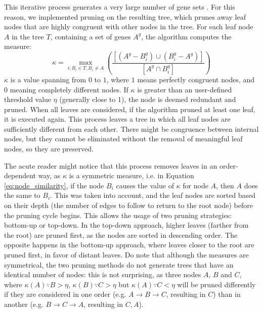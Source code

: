This iterative process generates a very large number of gene sets .
For this reason, we implemented pruning on the resulting tree, which prunes away
leaf nodes that are highly congruent with other nodes in the tree. For each leaf
node $A$ in the tree $T$, containing a set of genes $A^g$, the algorithm
computes the measure:
\begin{equation}
    \kappa = \max_{i:B_i \in T, B_i \ne A}\left(\frac{[(A^g - B_i^g) \cup (B_i^g - A^g)]}{[A^g \cap B_i^g]}\right)
    \label{eq:node_similarity}
\end{equation}
$\kappa$ is a value spanning from $0$ to $1$, where $1$ means perfectly
congruent nodes, and $0$ meaning completely different nodes. If $\kappa$ is
greater than an user-defined threshold value $\eta$ (generally close to 1),
the node is deemed redundant and pruned. When all leaves are considered, if the
algorithm pruned at least one leaf, it is executed again. This process leaves a
tree in which all leaf nodes are sufficiently different from each other. There
might be congruence between internal nodes, but they cannot be eliminated
without the removal of meaningful leaf nodes, so they are preserved.

The acute reader might notice that this process removes leaves in an
order-dependent way, as $\kappa$ is a symmetric measure, i.e. in Equation
\ref{eq:node_similarity}, if the node $B_i$ causes the value of $\kappa$ for
node $A$, then $A$ does the same to $B_i$.
This was taken into account, and the leaf nodes are sorted based on their depth
(the number of edges to follow to return to the root node) before the pruning
cycle begins. This allows the usage of two pruning strategies: bottom-up or
top-down. In the top-down approach, higher leaves (farther from the root) are
pruned first, as the nodes are sorted in descending order. The opposite happens
in the bottom-up approach, where leaves closer to the root are pruned first, in
favor of distant leaves.
Do note that although the measures are symmetrical, the two pruning methods do
not generate trees that have an identical number of nodes: this is not
surprising, as three nodes $A$, $B$ and $C$, where $\kappa(A) \because B >
\eta$, $\kappa(B) \because C > \eta$ but $\kappa(A)  \because C < \eta$ will be
pruned differently if they are considered in one order (e.g. $A \rightarrow B
\rightarrow C$, resulting in $C$) than in another (e.g. $B \rightarrow C
\rightarrow A$, resulting in $C, A$).

